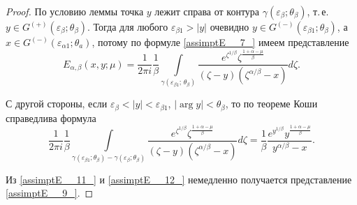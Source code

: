 \begin{proof}
По условию леммы точка $y$ лежит справа от контура $\gamma (\varepsilon _\beta  ;\theta _\beta )$, т.\,е. $y\in G^{(+)} (\varepsilon _\beta  ;\theta _\beta )$.
Тогда для любого $\varepsilon _{\beta 1} >|y|$ очевидно  $y\in G^{(-)} (\varepsilon_{\beta 1}; \theta _\beta) $,
а $x\in G^{(-)} (\varepsilon_{\alpha 1}; \theta_a) $,
потому по формуле \eqref{assimptE__7_} имеем представление 
\begin{equation}
\label{assimptE__11_}
E_{\alpha, \beta }  (x, y; \mu)=\frac{1}{2\pi i} \frac{1}{\beta } \int\limits_{\gamma \left(\varepsilon _{\beta 1};\,\theta _{\beta } \right)}\frac{e^{\zeta ^{1/\beta}} \zeta ^{\frac{1+\alpha -\mu }{\beta } } }{\left(\zeta -y\right)\left(\zeta^{\alpha /\beta}  -x\right)} d \zeta .
\end{equation}

С другой стороны, если
$\varepsilon _{\beta } <|y|<\varepsilon _{\beta 1}$,
$\left|\arg y\right|<\theta _{\beta } $, то по теореме Коши справедлива формула
\begin{equation}
\label{assimptE__12_}
\frac{1}{2\pi i} \frac{1}{\beta } \int\limits_{\gamma (\varepsilon_{\beta 1}; \theta _\beta) -\gamma (\varepsilon _\beta  ;\theta _\beta )}\frac{e^{\zeta ^{1/\beta}} \zeta ^{\frac{1+\alpha -\mu }{\beta } } }{\left(\zeta -y\right)\left(\zeta^{\alpha /\beta}  -x\right)} d \zeta =\frac{1}{\beta } \frac{e^{y^{1/\beta} } y^{\frac{1+\alpha -\mu }{\beta } } }{y^{\alpha/\beta}  -x} .
\end{equation}

Из \eqref{assimptE__11_} и \eqref{assimptE__12_} немедленно получается представление \eqref{assimptE__9_}.
\end{proof}

\smallskip

